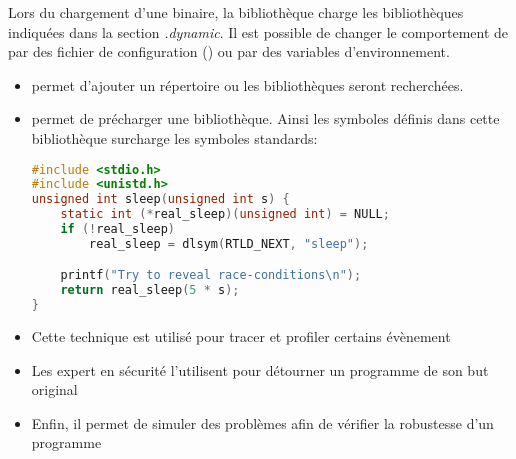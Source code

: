 \begin{frame}[fragile=singleslide]{}
  Lors du chargement d'une binaire, la bibliothèque  charge
  les bibliothèques indiquées dans  la section \emph{.dynamic}. Il est
  possible de  changer le comportement de   par des fichier
  de  configuration  ()  ou  par  des  variables
  d'environnement.
  \begin{itemize} 
  \item  {} permet d'ajouter  un répertoire  ou les
    bibliothèques seront recherchées.
  \item  {}  permet  de  précharger  une  bibliothèque.
    Ainsi les  symboles définis dans cette  bibliothèque surcharge les
    symboles standards:
    \begin{lstlisting}[language=c]
#include <stdio.h>
#include <unistd.h>
unsigned int sleep(unsigned int s) {
    static int (*real_sleep)(unsigned int) = NULL;
    if (!real_sleep)
        real_sleep = dlsym(RTLD_NEXT, "sleep");

    printf("Try to reveal race-conditions\n");
    return real_sleep(5 * s);
}
    \end{lstlisting} 
  \end{itemize}
\end{frame}  

\begin{frame}[fragile=singleslide]{}
  \begin{itemize} 
    \begin{lstlisting} 
host$ gcc -shared -ldl -fPIC mysleep.c -o libmysleep.so
target$ LD_PRELOAD=libmysleep.so ./hello 
target$ export LD_PRELOAD=libmysleep.so
taregt$ ./hello 
    \end{lstlisting} 
  \item Cette  technique est utilisé pour tracer  et profiler certains
    évènement
  \item Les expert en sécurité l'utilisent pour détourner un programme
    de son but original
  \item Enfin, il permet de  simuler des problèmes afin de vérifier la
    robustesse d'un programme
  \end{itemize} 
\end{frame}

